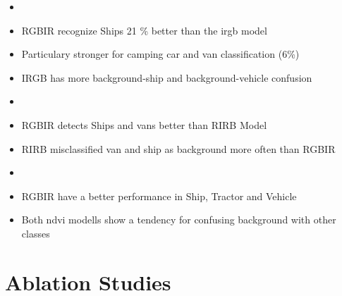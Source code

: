 \begin{itemize}
    \item {}
    \item RGBIR recognize Ships 21 \% better than the irgb model
    \item Particulary stronger for camping car and van classification (6\%)
    \item IRGB has more  background-ship and background-vehicle confusion
\end{itemize}

\begin{itemize}
    \item {}
    \item RGBIR detects Ships and vans better than RIRB Model
    \item RIRB misclassified van and ship as background more often than RGBIR

\end{itemize}


\begin{itemize}
    \item {}
    \item RGBIR have a better performance in Ship, Tractor and Vehicle
    \item Both ndvi modells show  a tendency for confusing background with other classes
\end{itemize}

\section{Ablation Studies}

